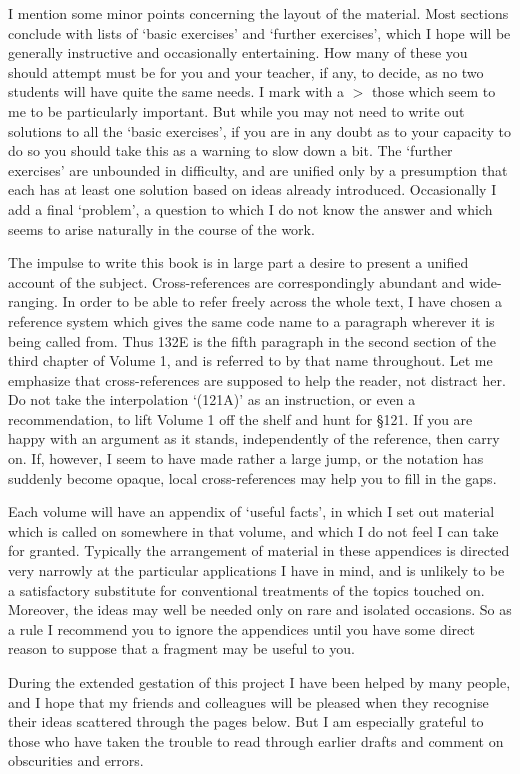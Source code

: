 I mention some minor points concerning the layout of the material.
Most sections conclude with lists of `basic exercises' and
`further exercises', which I hope will be generally instructive and
occasionally entertaining.   How many of these you should attempt must
be for you and your teacher, if any, to decide, as no two students will
have quite the same needs.   I mark with a $\pmb{>}$ those which seem to
me to be particularly important.   But while you may not need to write
out solutions to all the `basic exercises', if you are in any doubt
as to your capacity to do so you should take this as a warning to slow
down a bit.   The `further exercises' are unbounded in difficulty,
and are unified only by a presumption that each has at least one
solution based
on ideas already introduced.   Occasionally I add a final `problem',
a question to which I do not know the answer and which seems to arise
naturally in the course of the work.
     
The impulse to write this book is in large part a desire to present a
unified account of the subject.   Cross-references are correspondingly
abundant and wide-ranging.  In order to be able to refer freely across
the whole
text, I have chosen a reference system which gives the same code name to
a paragraph wherever it is being called from.   Thus 132E is the fifth
paragraph in the second section of the
third chapter of Volume 1, and is referred to by that name throughout.
Let me emphasize that cross-references are supposed to help the reader,
not distract her.   Do not take the interpolation `(121A)' as an
instruction, or even a recommendation, to lift Volume 1 off the shelf
and hunt for \S121.   If you are happy with an argument as it stands,
independently of the reference, then carry on.   If, however, I seem to
have made rather a large jump, or the notation has suddenly become
opaque, local cross-references may help you to fill in the gaps.
     
Each volume will have an appendix of `useful facts', in which I set
out material which is called on somewhere in that volume, and which I do
not feel I can take for granted.   Typically the arrangement of material
in these appendices is directed very narrowly at the particular
applications I have in mind, and is unlikely to be a satisfactory
substitute for conventional treatments of the topics touched on.
Moreover, the ideas may well be needed only on rare and isolated
occasions.   So as a rule I
recommend you to ignore the appendices until you have some
direct reason to suppose that a fragment may be useful to you.
     
During the extended gestation of this project I have been helped by many
people, and I hope that my friends and colleagues will be pleased when
they recognise their ideas scattered through the pages below.   But I am
especially grateful to those who have taken the trouble to read through
earlier drafts and comment on obscurities and errors.
     
     

     
